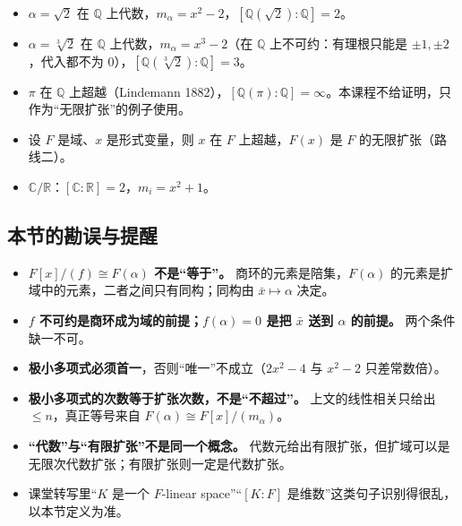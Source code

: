 \begin{itemize}
\item $\alpha=\sqrt2$ 在 $\mathbb Q$ 上代数，$m_\alpha=x^2-2$，$[\mathbb Q(\sqrt2):\mathbb Q]=2$。
\item $\alpha=\sqrt[3]{2}$ 在 $\mathbb Q$ 上代数，$m_\alpha=x^3-2$（在 $\mathbb Q$ 上不可约：有理根只能是 $\pm1,\pm2$，代入都不为 $0$），$[\mathbb Q(\sqrt[3]{2}):\mathbb Q]=3$。
\item $\pi$ 在 $\mathbb Q$ 上超越（Lindemann 1882），$[\mathbb Q(\pi):\mathbb Q]=\infty$。本课程不给证明，只作为“无限扩张”的例子使用。
\item 设 $F$ 是域、$x$ 是形式变量，则 $x$ 在 $F$ 上超越，$F(x)$ 是 $F$ 的无限扩张（路线二）。
\item $\mathbb C/\mathbb R$：$[\mathbb C:\mathbb R]=2$，$m_i=x^2+1$。
\end{itemize}


\subsection{本节的勘误与提醒}


\begin{itemize}
\item \textbf{$F[x]/(f)\cong F(\alpha)$ 不是“等于”。} 商环的元素是陪集，$F(\alpha)$ 的元素是扩域中的元素，二者之间只有同构；同构由 $\bar x\mapsto\alpha$ 决定。
\item \textbf{$f$ 不可约是商环成为域的前提；$f(\alpha)=0$ 是把 $\bar x$ 送到 $\alpha$ 的前提。} 两个条件缺一不可。
\item \textbf{极小多项式必须首一}，否则“唯一”不成立（$2x^2-4$ 与 $x^2-2$ 只差常数倍）。
\item \textbf{极小多项式的次数等于扩张次数，不是“不超过”。} 上文的线性相关只给出 $\le n$，真正等号来自 $F(\alpha)\cong F[x]/(m_\alpha)$。
\item \textbf{“代数”与“有限扩张”不是同一个概念。} 代数元给出有限扩张，但扩域可以是无限次代数扩张；有限扩张则一定是代数扩张。
\item 课堂转写里“$K$ 是一个 $F$-linear space”“$[K:F]$ 是维数”这类句子识别得很乱，以本节定义为准。
\end{itemize}
